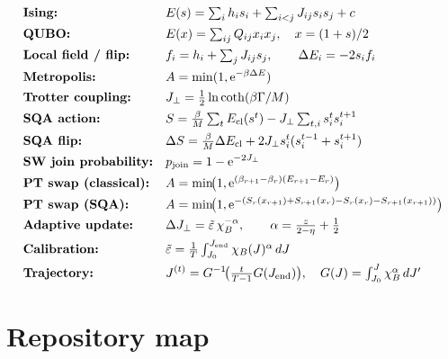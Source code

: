 \begin{keyeq}
\begin{align*}
&\textbf{Ising:} && E(s)=\textstyle\sum_i h_is_i+\sum_{i<j}J_{ij}s_is_j+c\\
&\textbf{QUBO:} && E(x)=\textstyle\sum_{ij}Q_{ij}x_ix_j,\quad x=(1+s)/2\\
&\textbf{Local field / flip:} && f_i=h_i+\textstyle\sum_jJ_{ij}s_j,\qquad
\Delta E_i=-2s_if_i\\
&\textbf{Metropolis:} && A=\min(1,\mathrm{e}^{-\beta\Delta E})\\
&\textbf{Trotter coupling:} && J_{\perp}=\tfrac12\ln\coth(\beta\Gamma/M)\\
&\textbf{SQA action:} && S=\tfrac{\beta}{M}\textstyle\sum_tE_{\mathrm{cl}}(s^t)
-J_{\perp}\sum_{t,i}s^t_is^{t+1}_i\\
&\textbf{SQA flip:} && \Delta S=\tfrac{\beta}{M}\Delta E_{\mathrm{cl}}
+2J_{\perp} s^t_i(s^{t-1}_i+s^{t+1}_i)\\
&\textbf{SW join probability:} && p_{\mathrm{join}}=1-\mathrm{e}^{-2J_{\perp}}\\
&\textbf{PT swap (classical):} && A=\min\!\bigl(1,
\mathrm{e}^{(\beta_{r+1}-\beta_r)(E_{r+1}-E_r)}\bigr)\\
&\textbf{PT swap (SQA):} && A=\min\!\bigl(1,
\mathrm{e}^{-(S_r(x_{r+1})+S_{r+1}(x_r)-S_r(x_r)-S_{r+1}(x_{r+1}))}\bigr)\\
&\textbf{Adaptive update:} && \Delta J_{\perp}=\tilde{\varepsilon}\,\chi_B^{-\alpha},\qquad
\alpha=\tfrac{z}{2-\eta}+\tfrac12\\
&\textbf{Calibration:} && \tilde{\varepsilon}=\tfrac1T\textstyle
\int_{J_0}^{J_{\mathrm{end}}}\chi_B(J)^\alpha\,dJ\\
&\textbf{Trajectory:} && J^{(t)}=G^{-1}\!\bigl(\tfrac{t}{T-1}G(J_{\mathrm{end}})\bigr),
\quad G(J)=\textstyle\int_{J_0}^{J}\chi_B^\alpha\,dJ'
\end{align*}
\end{keyeq}

\section{Repository map}

